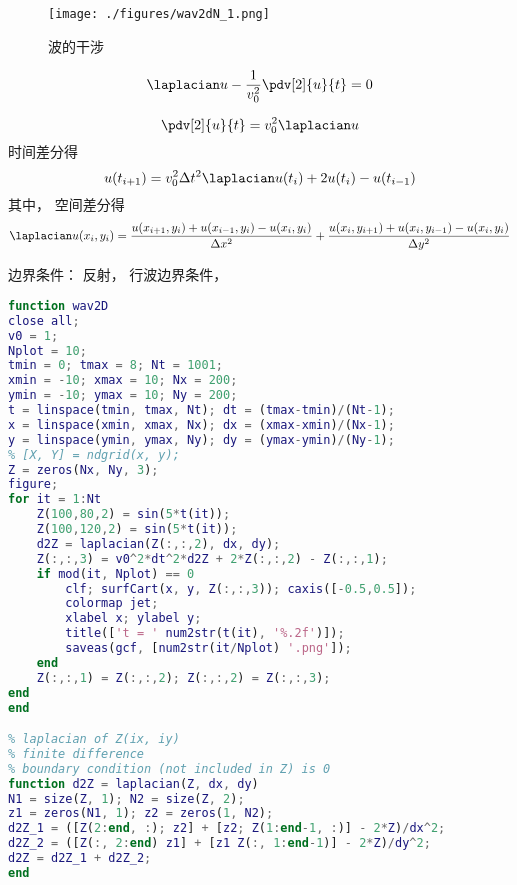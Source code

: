 
\begin{issues}
\issueDraft
\end{issues}


\begin{figure}[ht]
\centering
\texttt{[image: ./figures/wav2dN\_1.png]}
\caption{波的干涉} \label{wav2dN_fig1}
\end{figure}

\begin{equation}
\laplacian u - \frac{1}{v_0^2}\pdv[2]{u}{t} = 0
\end{equation}

\begin{equation}
\pdv[2]{u}{t} = v_0^2\laplacian u
\end{equation}
时间差分得
\begin{equation}
u(t_{i+1}) = v_0^2\Delta t^2\laplacian u(t_i) + 2u(t_{i}) - u(t_{i-1})
\end{equation}
其中， 空间差分得
\begin{equation}
\laplacian u(x_i,y_i) = \frac{u(x_{i+1}, y_i) + u(x_{i-1}, y_i) - u(x_{i}, y_i)}{\Delta x^2}
+ \frac{u(x_i, y_{i+1}) + u(x_i, y_{i-1}) - u(x_i, y_{i})}{\Delta y^2}
\end{equation}

边界条件： 反射， 行波边界条件， 

\begin{lstlisting}[language=matlab, caption=wav2D.m]
% 2D wave equation, by simple difference
function wav2D
close all;
v0 = 1;
Nplot = 10;
tmin = 0; tmax = 8; Nt = 1001;
xmin = -10; xmax = 10; Nx = 200;
ymin = -10; ymax = 10; Ny = 200;
t = linspace(tmin, tmax, Nt); dt = (tmax-tmin)/(Nt-1);
x = linspace(xmin, xmax, Nx); dx = (xmax-xmin)/(Nx-1);
y = linspace(ymin, ymax, Ny); dy = (ymax-ymin)/(Ny-1);
% [X, Y] = ndgrid(x, y);
Z = zeros(Nx, Ny, 3);
figure;
for it = 1:Nt
    Z(100,80,2) = sin(5*t(it));
    Z(100,120,2) = sin(5*t(it));
    d2Z = laplacian(Z(:,:,2), dx, dy);
    Z(:,:,3) = v0^2*dt^2*d2Z + 2*Z(:,:,2) - Z(:,:,1);
    if mod(it, Nplot) == 0
        clf; surfCart(x, y, Z(:,:,3)); caxis([-0.5,0.5]);
        colormap jet;
        xlabel x; ylabel y;
        title(['t = ' num2str(t(it), '%.2f')]);
        saveas(gcf, [num2str(it/Nplot) '.png']);
    end
    Z(:,:,1) = Z(:,:,2); Z(:,:,2) = Z(:,:,3);
end
end

% laplacian of Z(ix, iy)
% finite difference
% boundary condition (not included in Z) is 0
function d2Z = laplacian(Z, dx, dy)
N1 = size(Z, 1); N2 = size(Z, 2);
z1 = zeros(N1, 1); z2 = zeros(1, N2);
d2Z_1 = ([Z(2:end, :); z2] + [z2; Z(1:end-1, :)] - 2*Z)/dx^2;
d2Z_2 = ([Z(:, 2:end) z1] + [z1 Z(:, 1:end-1)] - 2*Z)/dy^2;
d2Z = d2Z_1 + d2Z_2;
end
\end{lstlisting}
